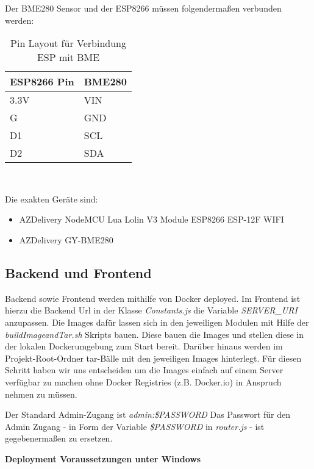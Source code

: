 Der BME280 Sensor und der ESP8266 müssen folgendermaßen verbunden werden:

\begin{table}[hbt]
	\centering
	\begin{minipage}[t]{.5\textwidth}
		\caption{Pin Layout für Verbindung ESP mit BME}
	\begin{tabular}{|l|l|}
		\hline
		\textbf{ESP8266 Pin}	& \textbf{BME280}  \\
		\hline
		3.3V & VIN \\
		\hline
		G & GND \\
		\hline
		D1 & SCL \\
		\hline
		D2 & SDA \\
		\hline
	\end{tabular}
	\\
\label{tab:espBmePinout}
\end{minipage}
\end{table}

Die exakten Geräte sind:

\begin{itemize}
	\item AZDelivery NodeMCU Lua Lolin V3 Module ESP8266 ESP-12F WIFI
	\item AZDelivery GY-BME280
\end{itemize}

 \subsection*{Backend und Frontend}

Backend sowie Frontend werden mithilfe von Docker deployed. Im Frontend ist hierzu die Backend Url in der Klasse \textit{Constants.js} die Variable \textit{SERVER\_URI} anzupassen. Die Images dafür lassen sich in den jeweiligen Modulen mit Hilfe der \textit{buildImageandTar.sh} Skripts bauen. Diese bauen die Images und stellen diese in der lokalen Dockerumgebung zum Start bereit. Darüber hinaus werden im Projekt-Root-Ordner tar-Bälle mit den jeweiligen Images hinterlegt. Für diesen Schritt haben wir uns entscheiden um die Images einfach auf einem Server verfügbar zu machen ohne Docker Registries (z.B. Docker.io) in Anspruch nehmen zu müssen.

Der Standard Admin-Zugang ist \textit{admin:\$PASSWORD} Das Passwort für den Admin Zugang - in Form der Variable \textit{\$PASSWORD} in \textit{router.js} - ist gegebenermaßen zu ersetzen.

\textbf{Deployment Voraussetzungen unter Windows}


